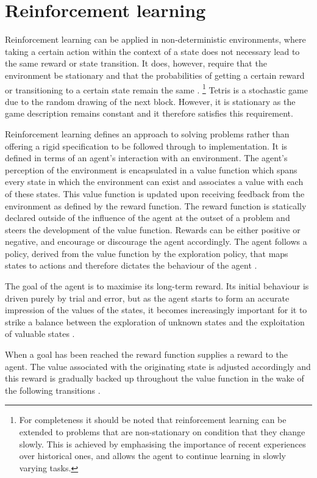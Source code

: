 \documentclass{rucsthesis}
\begin{document}
\section{Reinforcement learning}

Reinforcement learning can be applied in non-deterministic environments, where taking a certain action within the context of a state does not necessary lead to the same reward or state transition. It does, however, require that the environment be stationary and that the probabilities of getting a certain reward or transitioning to a certain state remain the same \citep{kaelbling96reinforcement}. \footnote{For completeness it should be noted that reinforcement learning can be extended to problems that are non-stationary on condition that they change slowly. This is achieved by emphasising the importance of recent experiences over historical ones, and allows the agent to continue learning in slowly varying tasks.} Tetris is a stochastic game due to the random drawing of the next block. However, it is stationary as the game description remains constant and it therefore satisfies this requirement.

Reinforcement learning defines an approach to solving problems rather than offering a rigid specification to be followed through to implementation. It is defined in terms of an agent's interaction with an environment. The agent's perception of the environment is encapsulated in a value function which spans every state in which the environment can exist and associates a value with each of these states. This value function is updated upon receiving feedback from the environment as defined by the reward function. The reward function is statically declared outside of the influence of the agent at the outset of a problem and steers the development of the value function. Rewards can be either positive or negative, and encourage or discourage the agent accordingly. The agent follows a policy, derived from the value function by the exploration policy, that maps states to actions and therefore dictates the behaviour of the agent \citep{suttonbarto}.

The goal of the agent is to maximise its long-term reward. Its initial behaviour is driven purely by trial and error, but as the agent starts to form an accurate impression of the values of the states, it becomes increasingly important for it to strike a balance between the exploration of unknown states and the exploitation of valuable states \citep{suttonbarto}.

When a goal has been reached the reward function supplies a reward to the agent.  The value associated with the originating state is adjusted accordingly and this reward is gradually backed up throughout the value function in the wake of the following transitions \citep{suttonbarto}.
\end{document}
